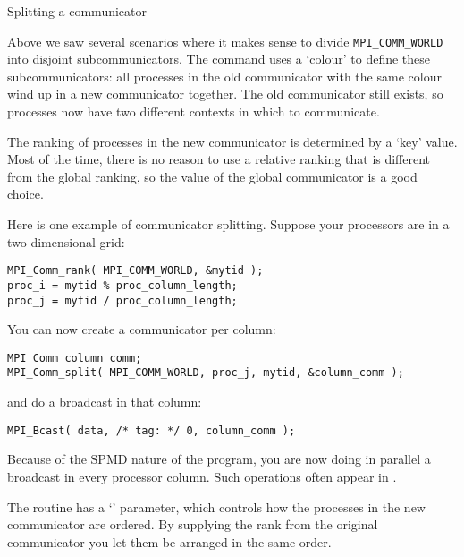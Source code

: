 
 {Splitting a communicator}
\label{sec:comm-split}

Above we saw several scenarios where it makes sense to divide
\lstinline{MPI_COMM_WORLD} into disjoint subcommunicators.
The command  uses a `colour' to define
these subcommunicators:
all processes in the old communicator with the same colour
wind up in a new communicator together. The old communicator still exists,
so processes now have two different contexts in which to communicate.

The ranking of processes in the new communicator is determined by a `key' value.
Most of the time, there is no reason to use a relative ranking that is different from
the global ranking, so the  value of the global communicator
is a good choice.

Here is one example of communicator splitting. Suppose your processors
are in a two-dimensional grid:
\begin{lstlisting}
MPI_Comm_rank( MPI_COMM_WORLD, &mytid );
proc_i = mytid % proc_column_length;
proc_j = mytid / proc_column_length;
\end{lstlisting}
You can now create a communicator per column:
\begin{lstlisting}
MPI_Comm column_comm;
MPI_Comm_split( MPI_COMM_WORLD, proc_j, mytid, &column_comm );
\end{lstlisting}
and do a broadcast in that column:
\begin{lstlisting}
MPI_Bcast( data, /* tag: */ 0, column_comm );
\end{lstlisting}
Because of the SPMD nature of the program, you are now doing in parallel
a broadcast in every processor column. Such operations often appear
in .

The  routine has a `' parameter,
which controls how the processes in the new communicator are
ordered. By supplying the rank from the original communicator you let
them be arranged in the same order.

